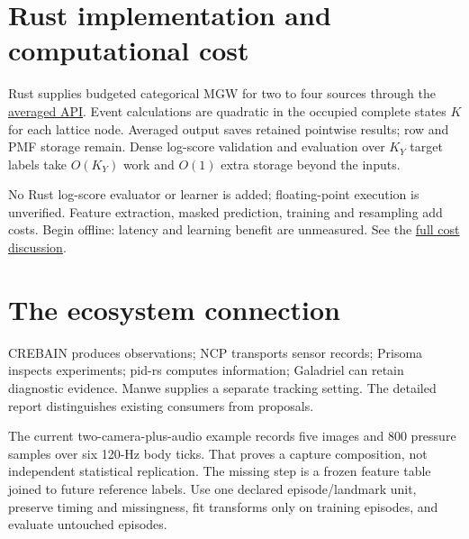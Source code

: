 \documentclass[11pt,a4paper]{article}
\begin{document}
\par{}

\section{Rust implementation and computational cost}\label{rust-implementation-and-computational-cost}

Rust supplies budgeted categorical MGW for two to four sources through the \href{https://github.com/sepahead/pid-rs/blob/main/crates/pid-core/src/lib.rs}{averaged API}. Event calculations are quadratic in the occupied complete states \(K\) for each lattice node. Averaged output saves retained pointwise results; row and PMF storage remain. Dense log-score validation and evaluation over \(K_Y\) target labels take \(O(K_Y)\) work and \(O(1)\) extra storage beyond the inputs.

No Rust log-score evaluator or learner is added; floating-point execution is unverified. Feature extraction, masked prediction, training and resampling add costs. Begin offline: latency and learning benefit are unmeasured. See the \href{https://github.com/sepahead/pid-rs/blob/main/audit/research/embodied-sensor-utility/EXPOSITION.md\#13-rust-implementation-and-computational-cost}{full cost discussion}.

\par{}

\section{The ecosystem connection}\label{the-ecosystem-connection}

CREBAIN produces observations; NCP transports sensor records; Prisoma inspects experiments; pid-rs computes information; Galadriel can retain diagnostic evidence. Manwe supplies a separate tracking setting. The detailed report distinguishes existing consumers from proposals.

The current two-camera-plus-audio example records five images and 800 pressure samples over six 120-Hz body ticks. That proves a capture composition, not independent statistical replication. The missing step is a frozen feature table joined to future reference labels. Use one declared episode/landmark unit, preserve timing and missingness, fit transforms only on training episodes, and evaluate untouched episodes.

\par{}
\end{document}
